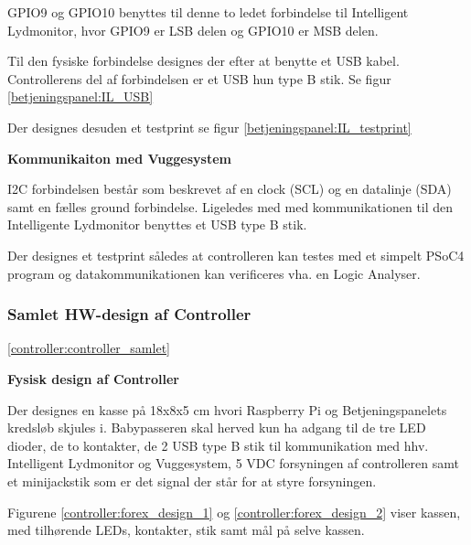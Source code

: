 GPIO9 og GPIO10 benyttes til denne to ledet forbindelse til Intelligent Lydmonitor, hvor GPIO9 er LSB delen og GPIO10 er MSB delen. 

Til den fysiske forbindelse designes der efter at benytte et USB kabel. Controllerens del af forbindelsen er et USB hun type B stik. Se figur \ref{betjeningspanel:IL_USB}

 
Der designes desuden et testprint se figur  \ref{betjeningspanel:IL_testprint}


\textbf{Kommunikaiton med Vuggesystem}

I2C forbindelsen består som beskrevet af en clock (SCL) og en datalinje (SDA) samt en fælles ground forbindelse. Ligeledes med med kommunikationen til den Intelligente Lydmonitor benyttes et USB type B stik.


Der designes et testprint således at controlleren kan testes med et simpelt PSoC4 program og datakommunikationen kan verificeres vha. en Logic Analyser.


\subsubsection*{Samlet HW-design af Controller}

\ref{controller:controller_samlet}


\textbf{Fysisk design af Controller}

Der designes en kasse på 18x8x5 cm hvori Raspberry Pi og Betjeningspanelets kredsløb skjules i. Babypasseren skal herved kun ha adgang til de tre LED dioder, de to kontakter, de 2 USB type B stik til kommunikation med hhv. Intelligent Lydmonitor og Vuggesystem, 5 VDC forsyningen af controlleren samt et minijackstik som er det signal der står for at styre forsyningen. 

Figurene \ref{controller:forex_design_1} og \ref{controller:forex_design_2} viser kassen, med tilhørende LEDs, kontakter, stik samt mål på selve kassen.



